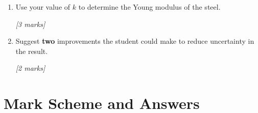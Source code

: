 \begin{tcolorbox}[colback=white, colframe=midblue, breakable]
\begin{enumerate}[label=(\alph*)]
  \item \begin{minipage}[t]{\linewidth}
  Use your value of $k$ to determine the Young modulus of the steel.
  \par\hfill\textit{[3 marks]}
  \vspace{4cm}
  \end{minipage}

  \item \begin{minipage}[t]{\linewidth}
  Suggest \textbf{two} improvements the student could make to reduce uncertainty in the result.
  \par\hfill\textit{[2 marks]}
  \vspace{3cm}
  \end{minipage}
\end{enumerate}

\end{tcolorbox}

\pagebreak

\section{Mark Scheme and Answers}

